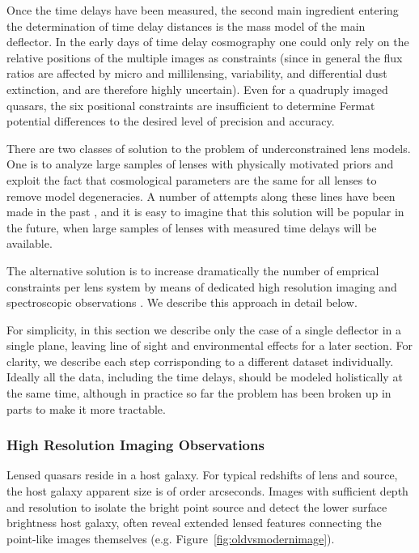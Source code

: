 Once the time delays have been measured, the second main ingredient
entering the determination of time delay distances is the mass model
of the main deflector. In the early days of time delay cosmography one
could only rely on the relative positions of the multiple images as
constraints (since in general the flux ratios are affected by micro
and millilensing, variability, and differential dust extinction, and
are therefore highly uncertain). Even for a quadruply imaged quasars,
the six positional constraints are insufficient to determine Fermat
potential differences to the desired level of precision and accuracy.

There are two classes of solution to the problem of underconstrained
lens models. One is to analyze large samples of lenses with physically
motivated priors and exploit the fact that cosmological parameters are
the same for all lenses to remove model degeneracies. A number of
attempts along these lines have been made in the past \citep{Ogu07b},
and it is easy to imagine that this solution will be popular in the
future, when large samples of lenses with measured time delays will be
available.

The alternative solution is to increase dramatically the number of
emprical constraints per lens system by means of dedicated high
resolution imaging and spectroscopic observations
\citep{Suy++10,Suy++13,Suy++14}. We describe this approach in detail
below.

For simplicity, in this section we describe only the case of a single
deflector in a single plane, leaving line of sight and environmental
effects for a later section. For clarity, we describe each step
corrisponding to a different dataset individually. Ideally all the
data, including the time delays, should be modeled holistically at the
same time, although in practice so far the problem has been broken up
in parts to make it more tractable.


\subsubsection{High Resolution Imaging Observations}

Lensed quasars reside in a host galaxy. For typical redshifts of lens
and source, the host galaxy apparent size is of order
arcseconds. Images with sufficient depth and resolution to isolate the
bright point source and detect the lower surface brightness host
galaxy, often reveal extended lensed features connecting the
point-like images themselves (e.g. Figure~\ref{fig:oldvsmodernimage}).

